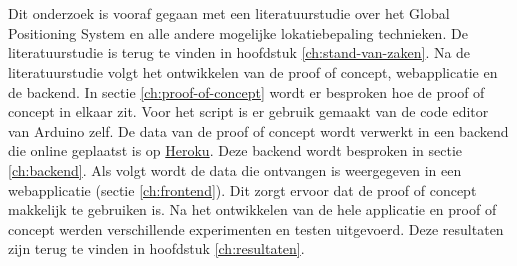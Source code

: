 
\chapter{}
\label{ch:methodologie}

Dit onderzoek is vooraf gegaan met een literatuurstudie over het Global Positioning System en alle andere mogelijke lokatiebepaling technieken. De literatuurstudie is terug te vinden in hoofdstuk \ref{ch:stand-van-zaken}.
\newline
\newline
Na de literatuurstudie volgt het ontwikkelen van de proof of concept, webapplicatie en de backend. In sectie \ref{ch:proof-of-concept} wordt er besproken hoe de proof of concept in elkaar zit. Voor het script is er gebruik gemaakt van de code editor van Arduino zelf. 
\newline
\newline
De data van de proof of concept wordt verwerkt in een backend die online geplaatst is op \href{www.heroku.com}{Heroku}. Deze backend wordt besproken in sectie \ref{ch:backend}.
\newline
\newline
Als volgt wordt de data die ontvangen is weergegeven in een webapplicatie (sectie \ref{ch:frontend}). Dit zorgt ervoor dat de proof of concept makkelijk te gebruiken is. 
\newline
\newline
Na het ontwikkelen van de hele applicatie en proof of concept werden verschillende experimenten en testen uitgevoerd. Deze resultaten zijn terug te vinden in hoofdstuk \ref{ch:resultaten}.


